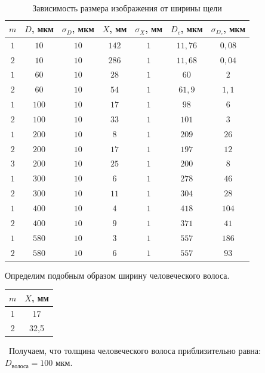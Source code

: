 \documentclass[a5paper,10pt, twoside]{article} %
\begin{document}
	\begin{table}[h]
		\begin{center}
			\begin{tabular}{| c | c | c | c | c | c | c |}
				\hline
				$m$ & $D$, мкм & $\sigma_D$, мкм & $X$, мм & $\sigma_X$, мм & $D_c$, мкм & $\sigma_{D_c}$, мкм\\
				\hline
				$1$ & $10$ & $10$ & $142$ & $1$ & $11,76$ & $0,08$\\
				\hline
				$2$ & $10$ & $10$ & $286$ & $1$ & $11,68$ & $0,04$\\
				\hline
				$1$ & $60$ & $10$ & $28$ & $1$ & $60$ & $2$\\
				\hline
				$2$ & $60$ & $10$ & $54$ & $1$ & $61,9$ & $1,1$\\
				\hline
				$1$ & $100$ & $10$ & $17$ & $1$ & $98$ & $6$\\
				\hline
				$2$ & $100$ & $10$ & $33$ & $1$ & $101$ & $3$\\
				\hline
				$1$ & $200$ & $10$ & $8$ & $1$ & $209$ & $26$\\
				\hline
				$2$ & $200$ & $10$ & $17$ & $1$ & $197$ & $12$\\
				\hline
				$3$ & $200$ & $10$ & $25$ & $1$ & $200$ & $8$\\
				\hline
				$1$ & $300$ & $10$ & $6$ & $1$ & $278$ & $46$\\
				\hline
				$2$ & $300$ & $10$ & $11$ & $1$ & $304$ & $28$\\
				\hline
				$1$ & $400$ & $10$ & $4$ & $1$ & $418$ & $104$\\
				\hline
				$2$ & $400$ & $10$ & $9$ & $1$ & $371$ & $41$\\
				\hline
				$1$ & $580$ & $10$ & $3$ & $1$ & $557$ & $186$\\
				\hline
				$2$ & $580$ & $10$ & $6$ & $1$ & $557$ & $93$\\
				\hline
				\end{tabular}
		\end{center}
		\caption{Зависимость размера изображения от ширины щели}
	\end{table}

	Определим подобным образом ширину человеческого волоса. 

	\begin{table}[h!]
		\begin{center}
		\begin{tabular}{| c | c |}
			\hline
			$m$ & $X$, мм\\
			\hline
			1 & 17\\
			\hline
			2 & 32,5\\
			\hline
		\end{tabular}
		\end{center}
	\end{table}
	\
	Получаем, что толщина человеческого волоса приблизительно равна: $D_\text{волоса} = 100$ мкм.
\end{document}
